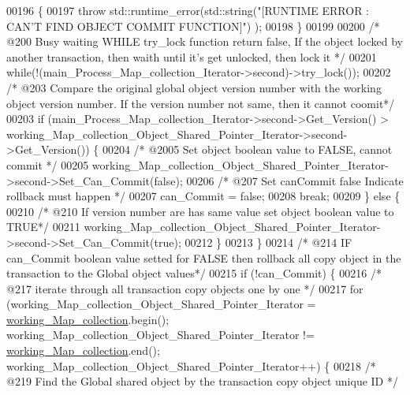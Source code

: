 \begin{DoxyCode}
00196             \{
00197                 \textcolor{keywordflow}{throw} std::runtime\_error(std::string(\textcolor{stringliteral}{"[RUNTIME ERROR : CAN'T FIND OBJECT COMMIT FUNCTION]"})
      );
00198             \}
00199 
00200         \textcolor{comment}{/* @200 Busy waiting WHILE try\_lock function return false, If the object locked by another
       transaction, then waith until it's get unlocked, then lock it */}
00201         \textcolor{keywordflow}{while}(!(main\_Process\_Map\_collection\_Iterator->second)->try\_lock());
00202         \textcolor{comment}{/* @203 Compare the original global object version number with the working object version number.
       If the version number not same, then it cannot coomit*/}
00203         \textcolor{keywordflow}{if} (main\_Process\_Map\_collection\_Iterator->second->Get\_Version() > 
      working\_Map\_collection\_Object\_Shared\_Pointer\_Iterator->second->Get\_Version()) \{
00204             \textcolor{comment}{/* @2005 Set object boolean value to FALSE, cannot commit */}
00205             working\_Map\_collection\_Object\_Shared\_Pointer\_Iterator->second->Set\_Can\_Commit(\textcolor{keyword}{false});
00206             \textcolor{comment}{/* @207 Set canCommit false Indicate rollback must happen */}
00207             can\_Commit = \textcolor{keyword}{false};
00208             \textcolor{keywordflow}{break};
00209         \} \textcolor{keywordflow}{else} \{
00210             \textcolor{comment}{/* @210 If version number are has same value set object boolean value to TRUE*/} 
00211             working\_Map\_collection\_Object\_Shared\_Pointer\_Iterator->second->Set\_Can\_Commit(\textcolor{keyword}{true});
00212         \}
00213     \}
00214     \textcolor{comment}{/* @214 IF can\_Commit boolean value setted for FALSE then rollback all copy object in the transaction
       to the Global object values*/}
00215     \textcolor{keywordflow}{if} (!can\_Commit) \{
00216         \textcolor{comment}{/* @217 iterate through all transaction copy objects one by one */}
00217         \textcolor{keywordflow}{for} (working\_Map\_collection\_Object\_Shared\_Pointer\_Iterator = 
      \hyperlink{class_t_x_a81aafda16e2f20e36ec6c68e584668ff_a81aafda16e2f20e36ec6c68e584668ff}{working\_Map\_collection}.begin(); working\_Map\_collection\_Object\_Shared\_Pointer\_Iterator
       != \hyperlink{class_t_x_a81aafda16e2f20e36ec6c68e584668ff_a81aafda16e2f20e36ec6c68e584668ff}{working\_Map\_collection}.end(); 
      working\_Map\_collection\_Object\_Shared\_Pointer\_Iterator++) \{
00218             \textcolor{comment}{/* @219 Find the Global shared object by the transaction copy object unique ID */}

\end{DoxyCode}
